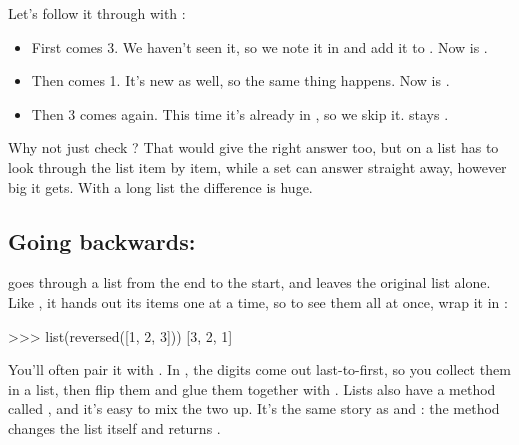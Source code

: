 \documentclass[10pt,a4paper]{article}
\begin{document}
Let’s follow it through with :
\begin{itemize}
\item First comes 3. We haven’t seen it, so we note it in  and add it to . Now  is \code{[3]}.
\item Then comes 1. It’s new as well, so the same thing happens. Now  is \code{[3,\allowbreak{}\ 1]}.
\item Then 3 comes again. This time it’s already in , so we skip it.  stays \code{[3,\allowbreak{}\ 1]}.
\end{itemize}
Why not just check ? That would give the right answer too, but  on a list has to look through the list item by item, while a set can answer straight away, however big it gets. With a long list the difference is huge.
\subsection{Going backwards: }
 goes through a list from the end to the start, and leaves the original list alone. Like , it hands out its items one at a time, so to see them all at once, wrap it in :
\begin{txtcode}
>>> list(reversed([1, 2, 3]))
[3, 2, 1]
\end{txtcode}
You’ll often pair it with . In , the digits come out last-to-first, so you collect them in a list, then flip them and glue them together with .
Lists also have a method called , and it’s easy to mix the two up. It’s the same story as  and : the method changes the list itself and returns .
\end{document}
